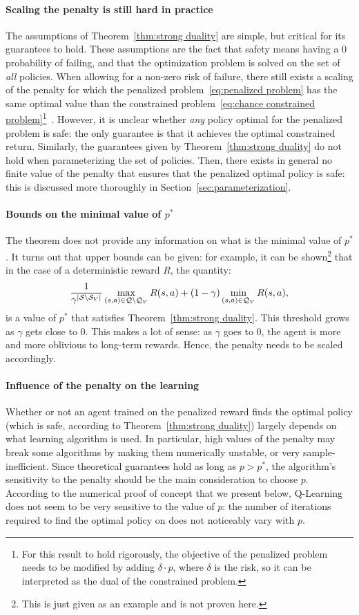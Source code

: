 \paragraph{Scaling the penalty is still hard in practice} The assumptions of Theorem~\ref{thm:strong duality} are simple, but critical for its guarantees to hold. These assumptions are the fact that safety means having a $0$ probability of failing, and that the optimization problem is solved on the set of\emph{ all} policies. When allowing for a non-zero risk of failure, there still exists a scaling of the penalty for which the penalized problem~\eqref{eq:penalized problem} has the same optimal value than the constrained problem~\eqref{eq:chance constrained problem}\footnote{For this result to hold rigorously, the objective of the penalized problem needs to be modified by adding $\delta\cdot p$, where $\delta$ is the risk, so it can be interpreted as the dual of the constrained problem.}~\cite{paternain2019safe}. However, it is unclear whether\emph{ any} policy optimal for the penalized problem is safe: the only guarantee is that it achieves the optimal constrained return. Similarly, the guarantees given by Theorem~\ref{thm:strong duality} do not hold when parameterizing the set of policies. Then, there exists in general no finite value of the penalty that ensures that the penalized optimal policy is safe: this is discussed more thoroughly in Section~\ref{sec:parameterization}.
\paragraph{Bounds on the minimal value of $p^*$} \label{sec:gamma p trade off} The theorem does not provide any information on what is the minimal value of $p^*$. It turns out that upper bounds can be given: for example, it can be shown\footnote{This is just given as an example and is not proven here.} that in the case of a deterministic reward $R$, the quantity: 
$$
	\frac{1}{\gamma^{|\mathcal{S}\setminus{\ensuremath{\mathcal{S}}_{V}}|}}\max_{(s,a)\in\mathcal{Q}\setminus\mathcal{Q}_{V}}R(s, a) + (1 - \gamma)\min_{(s, a)\in\mathcal{Q}_{V}}R(s, a),
$$
is a value of $p^*$ that satisfies Theorem~\ref{thm:strong duality}. This threshold grows as $\gamma$ gets close to $0$. This makes a lot of sense: as $\gamma$ goes to $0$, the agent is more and more oblivious to long-term rewards. Hence, the penalty needs to be scaled accordingly.

\paragraph{Influence of the penalty on the learning} Whether or not an agent trained on the penalized reward finds the optimal policy (which is safe, according to Theorem~\ref{thm:strong duality}) largely depends on what learning algorithm is used. In particular, high values of the penalty may break some algorithms by making them numerically unstable, or very sample-inefficient. Since theoretical guarantees hold as long as $p > p^*$, the algorithm's sensitivity to the penalty should be the main consideration to choose $p$. According to the numerical proof of concept that we present below, Q-Learning does not seem to be very sensitive to the value of $p$: the number of iterations required to find the optimal policy on does not noticeably vary with $p$.

